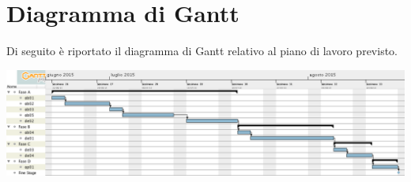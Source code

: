 \section*{Diagramma di Gantt}
Di seguito è riportato il diagramma di Gantt relativo al piano di lavoro previsto.
\begin{center}
	\includegraphics[width=18cm]{img/gantt.png}
\end{center}
